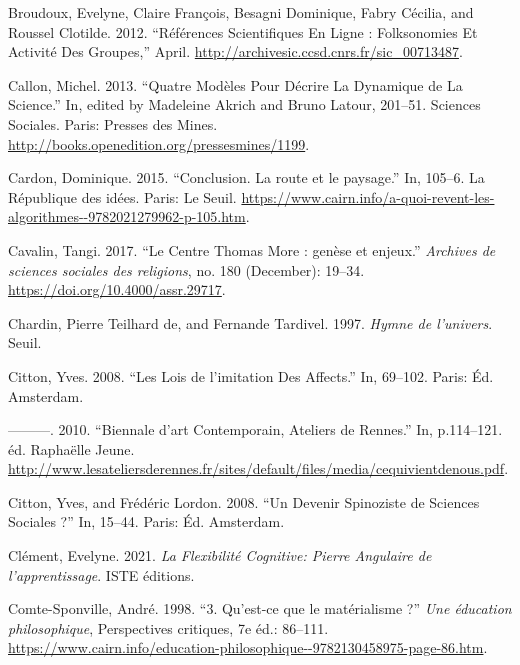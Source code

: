 \documentclass[
  letterpaper,
  DIV=11,
  numbers=noendperiod]{scrreprt}
\newlength{\cslhangindent}
\newlength{\cslentryspacingunit} %
\newenvironment{CSLReferences}[2] %
 {%
  \setlength{\parindent}{0pt}
  \ifodd #1
  \let\oldpar\par
  \def\par{\hangindent=\cslhangindent\oldpar}
  \fi
  \setlength{\parskip}{#2\cslentryspacingunit}
 }%
 {}
\begin{document}
\begin{CSLReferences}{1}{0}
\leavevmode{}%
Broudoux, Evelyne, Claire François, Besagni Dominique, Fabry Cécilia,
and Roussel Clotilde. 2012. {``Références Scientifiques En Ligne :
Folksonomies Et Activité Des Groupes,''} April.
\url{http://archivesic.ccsd.cnrs.fr/sic_00713487}.

\leavevmode{}%
Callon, Michel. 2013. {``Quatre Modèles Pour Décrire La Dynamique de La
Science.''} In, edited by Madeleine Akrich and Bruno Latour, 201--51.
Sciences Sociales. Paris: Presses des Mines.
\url{http://books.openedition.org/pressesmines/1199}.

\leavevmode{}%
Cardon, Dominique. 2015. {``Conclusion. La route et le paysage.''} In,
105--6. La République des idées. Paris: Le Seuil.
\url{https://www.cairn.info/a-quoi-revent-les-algorithmes--9782021279962-p-105.htm}.

\leavevmode{}%
Cavalin, Tangi. 2017. {``Le Centre Thomas More : genèse et enjeux.''}
\emph{Archives de sciences sociales des religions}, no. 180 (December):
19--34. \url{https://doi.org/10.4000/assr.29717}.

\leavevmode{}%
Chardin, Pierre Teilhard de, and Fernande Tardivel. 1997. \emph{Hymne de
l'univers}. Seuil.

\leavevmode{}%
Citton, Yves. 2008. {``Les Lois de l'imitation Des Affects.''} In,
69--102. Paris: Éd. Amsterdam.

\leavevmode{}%
---------. 2010. {``Biennale d{'}art Contemporain, Ateliers de
Rennes.''} In, p.114--121. éd. Raphaëlle Jeune.
\url{http://www.lesateliersderennes.fr/sites/default/files/media/cequivientdenous.pdf}.

\leavevmode{}%
Citton, Yves, and Frédéric Lordon. 2008. {``Un Devenir Spinoziste de
Sciences Sociales ?''} In, 15--44. Paris: Éd. Amsterdam.

\leavevmode{}%
Clément, Evelyne. 2021. \emph{La Flexibilité Cognitive: Pierre Angulaire
de l'apprentissage}. ISTE éditions.

\leavevmode{}%
Comte-Sponville, André. 1998. {``3. Qu'est-ce que le matérialisme ?''}
\emph{Une éducation philosophique}, Perspectives critiques, 7e éd.:
86--111.
\url{https://www.cairn.info/education-philosophique--9782130458975-page-86.htm}.


\end{CSLReferences}
\end{document}
